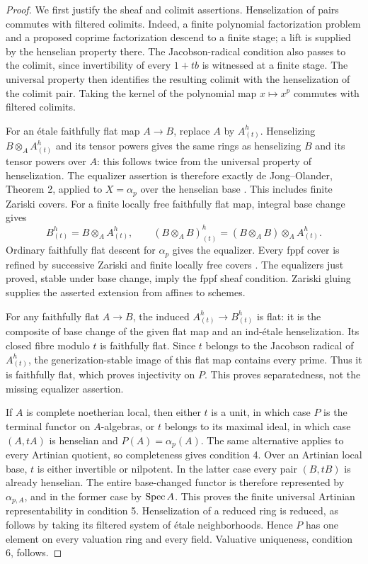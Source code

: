 \begin{proof}
We first justify the sheaf and colimit assertions. Henselization of
pairs commutes with filtered colimits. Indeed, a finite polynomial
factorization problem and a proposed coprime factorization descend
to a finite stage; a lift is supplied by the henselian property
there. The Jacobson-radical condition also passes to the colimit,
since invertibility of every $1+tb$ is witnessed at a finite stage.
The universal property then identifies the resulting colimit with
the henselization of the colimit pair. Taking the kernel of the
polynomial map $x\mapsto x^p$ commutes with filtered colimits.

For an \'etale faithfully flat map $A\to B$, replace $A$ by
$A^h_{(t)}$. Henselizing $B\otimes_A A^h_{(t)}$ and its tensor
powers gives the same rings as henselizing $B$ and its tensor
powers over $A$: this follows twice from the universal property
of henselization. The equalizer assertion is therefore exactly
de Jong--Olander, Theorem 2, applied to $X=\alpha_p$ over the
henselian base \cite{deJongOlanderHenselian}. This includes finite
Zariski covers. For a finite locally free faithfully flat map,
integral base change gives
\[
 B^h_{(t)}=B\otimes_A A^h_{(t)},\qquad
 (B\otimes_A B)^h_{(t)}
   =(B\otimes_A B)\otimes_A A^h_{(t)}.
\]
Ordinary faithfully flat descent for $\alpha_p$ gives the
equalizer. Every fppf cover is refined by successive Zariski and
finite locally free covers \cite[Lemma 37.48.2]{StacksFppfRefinement}.
The equalizers just proved, stable under base change, imply the
fppf sheaf condition. Zariski gluing supplies the asserted extension
from affines to schemes.

For any faithfully flat $A\to B$, the induced
$A^h_{(t)}\to B^h_{(t)}$ is flat: it is the composite of base
change of the given flat map and an ind-\'etale henselization.
Its closed fibre modulo $t$ is faithfully flat. Since $t$ belongs
to the Jacobson radical of $A^h_{(t)}$, the generization-stable
image of this flat map contains every prime. Thus it is faithfully
flat, which proves injectivity on $P$. This proves separatedness,
not the missing equalizer assertion.

If $A$ is complete noetherian local, then either $t$ is a unit,
in which case $P$ is the terminal functor on $A$-algebras, or
$t$ belongs to its maximal ideal, in which case $(A,tA)$ is
henselian and $P(A)=\alpha_p(A)$. The same alternative applies
to every Artinian quotient, so completeness gives condition 4.
Over an Artinian local base, $t$ is either invertible or nilpotent.
In the latter case every pair $(B,tB)$ is already henselian.
The entire base-changed functor is therefore represented by
$\alpha_{p,A}$, and in the former case by $\operatorname{Spec} A$. This proves
the finite universal Artinian representability in condition 5.
Henselization of a reduced ring is reduced, as follows by taking
its filtered system of \'etale neighborhoods. Hence $P$ has one
element on every valuation ring and every field. Valuative
uniqueness, condition 6, follows.


\end{proof}
